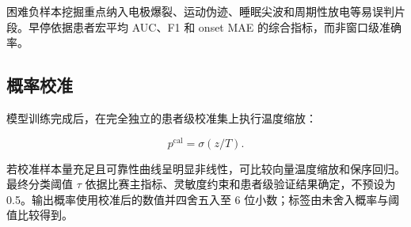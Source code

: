 \documentclass{cumcmthesis}
\numberwithin{figure}{section} %
\numberwithin{table}{section} %
\begin{document}
困难负样本挖掘重点纳入电极爆裂、运动伪迹、睡眠尖波和周期性放电等易误判片段。早停依据患者宏平均 AUC、F1 和 onset MAE 的综合指标，而非窗口级准确率。

\subsection{概率校准}

模型训练完成后，在完全独立的患者级校准集上执行温度缩放：

$$
p^{\mathrm{cal}}=\sigma(z/T).
$$

若校准样本量充足且可靠性曲线呈明显非线性，可比较向量温度缩放和保序回归。最终分类阈值 $\tau$ 依据比赛主指标、灵敏度约束和患者级验证结果确定，不预设为 0.5。输出概率使用校准后的数值并四舍五入至 6 位小数；标签由未舍入概率与阈值比较得到。



\end{document}
